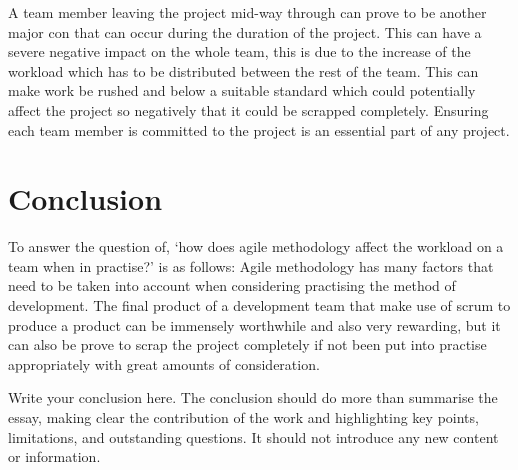 \documentclass{scrartcl}
\begin{document}
A team member leaving the project mid-way through can prove to be another major con that can occur during the duration of the project. This can have a severe negative impact on the whole team, this is due to the increase of the workload which has to be distributed between the rest of the team. This can make work be rushed and below a suitable standard which could potentially affect the project so negatively that it could be scrapped completely. Ensuring each team member is committed to the project is an essential part of any project. 

\section{Conclusion}
To answer the question of, ‘how does agile methodology affect the workload on a team when in practise?’ is as follows: Agile methodology has many factors that need to be taken into account when considering practising the method of development. The final product of a development team that make use of scrum to produce a product can be immensely worthwhile and also very rewarding, but it can also be prove to scrap the project completely if not been put into practise appropriately with great amounts of consideration. 

Write your conclusion here. The conclusion should do more than summarise the essay, making clear the contribution of the work and highlighting key points, limitations, and outstanding questions. It should not introduce any new content or information.



\end{document}
